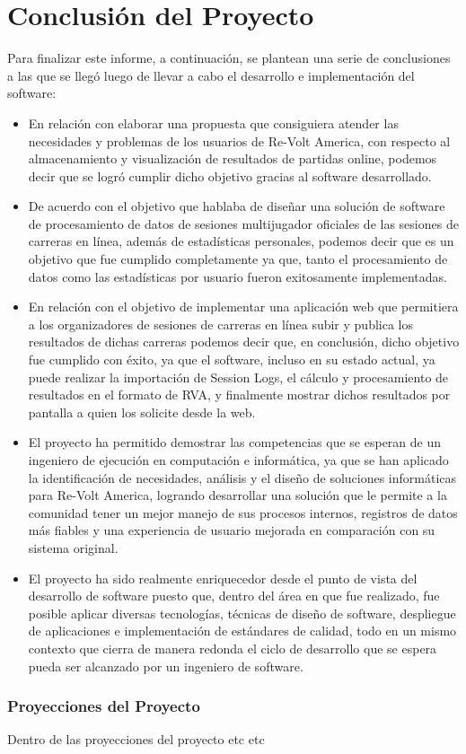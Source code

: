 \chapter{Conclusión del Proyecto}
Para finalizar este informe, a continuación, se plantean una serie de conclusiones a las que se llegó luego de llevar a cabo el desarrollo e implementación del software:

\begin{itemize}
	\item En relación con elaborar una propuesta que consiguiera atender las necesidades y problemas de los usuarios de Re-Volt America, con respecto al almacenamiento y visualización de resultados de partidas online, podemos decir que se logró cumplir dicho objetivo gracias al software desarrollado.
	\item De acuerdo con el objetivo que hablaba de diseñar una solución de software de procesamiento de datos de sesiones multijugador oficiales de las sesiones de carreras en línea, además de estadísticas personales, podemos decir que es un objetivo que fue cumplido completamente ya que, tanto el procesamiento de datos como las estadísticas por usuario fueron exitosamente implementadas.
	\item En relación con el objetivo de implementar una aplicación web que permitiera a los organizadores de sesiones de carreras en línea subir y publica los resultados de dichas carreras podemos decir que, en conclusión, dicho objetivo fue cumplido con éxito, ya que el software, incluso en su estado actual, ya puede realizar la importación de Session Logs, el cálculo y procesamiento de resultados en el formato de RVA, y finalmente mostrar dichos resultados por pantalla a quien los solicite desde la web.
	\item El proyecto ha permitido demostrar las competencias que se esperan de un ingeniero de ejecución en computación e informática, ya que se han aplicado la identificación de necesidades, análisis y el diseño de soluciones informáticas para Re-Volt America, logrando desarrollar una solución que le permite a la comunidad tener un mejor manejo de sus procesos internos, registros de datos más fiables y una experiencia de usuario mejorada en comparación con su sistema original. 
	\item El proyecto ha sido realmente enriquecedor desde el punto de vista del desarrollo de software puesto que, dentro del área en que fue realizado, fue posible aplicar diversas tecnologías, técnicas de diseño de software, despliegue de aplicaciones e implementación de estándares de calidad, todo en un mismo contexto que cierra de manera redonda el ciclo de desarrollo que se espera pueda ser alcanzado por un ingeniero de software.
\end{itemize}

\subsection{Proyecciones del Proyecto}
Dentro de las proyecciones del proyecto etc etc
